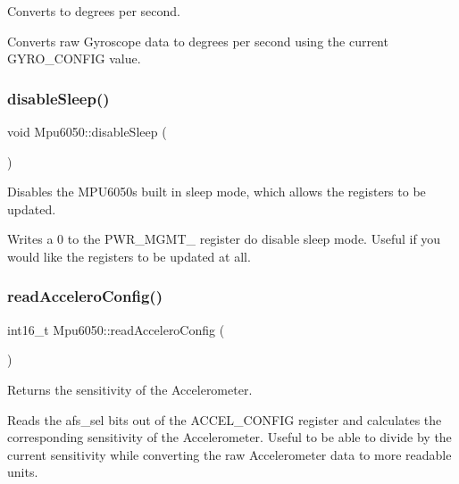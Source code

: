 Converts to degrees per second. 

Converts raw Gyroscope data to degrees per second using the current G\+Y\+R\+O\+\_\+\+C\+O\+N\+F\+IG value. \mbox{\label{classMpu6050_a34c0508df81ca0f2dbcf9b6fba21148e}} 
\subsubsection{\texorpdfstring{disable\+Sleep()}{disableSleep()}}
{\footnotesize\ttfamily void Mpu6050\+::disable\+Sleep (\begin{DoxyParamCaption}{ }\end{DoxyParamCaption})\hspace{0.3cm}{\ttfamily [virtual]}}



Disables the M\+P\+U6050\textquotesingle{}s built in sleep mode, which allows the registers to be updated. 

Writes a 0 to the P\+W\+R\+\_\+\+M\+G\+M\+T\+\_ register do disable sleep mode. Useful if you would like the registers to be updated at all. \mbox{\label{classMpu6050_a2f4ca51ed27c06d62b8060841c62ec4b}} 
\subsubsection{\texorpdfstring{read\+Accelero\+Config()}{readAcceleroConfig()}}
{\footnotesize\ttfamily int16\+\_\+t Mpu6050\+::read\+Accelero\+Config (\begin{DoxyParamCaption}{ }\end{DoxyParamCaption})\hspace{0.3cm}{\ttfamily [virtual]}}



Returns the sensitivity of the Accelerometer. 

Reads the afs\+\_\+sel bits out of the A\+C\+C\+E\+L\+\_\+\+C\+O\+N\+F\+IG register and calculates the corresponding sensitivity of the Accelerometer. Useful to be able to divide by the current sensitivity while converting the raw Accelerometer data to more readable units. \mbox{\label{classMpu6050_aa79e259de84f90235cc62e7fa10d2ebe}} 
